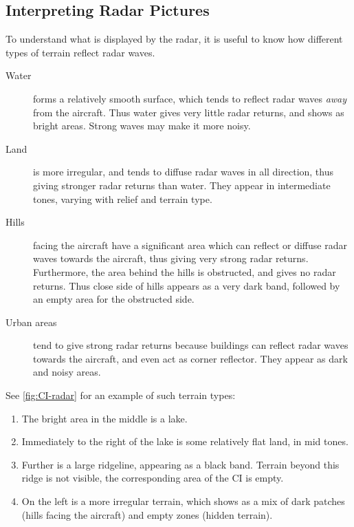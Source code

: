 \subsection{Interpreting Radar Pictures}
To understand what is displayed by the radar,
it is useful to know how different types of terrain reflect radar waves.
\begin{description}
  \item[Water] forms a relatively smooth surface, which tends to reflect radar waves \emph{away} from the aircraft.
    Thus water gives very little radar returns, and shows as bright areas.
    Strong waves may make it more noisy.

  \item[Land] is more irregular, and tends to diffuse radar waves in all direction,
    thus giving stronger radar returns than water.
    They appear in intermediate tones, varying with relief and terrain type.

  \item[Hills] facing the aircraft have a significant area which can
    reflect or diffuse radar waves towards the aircraft, thus giving very strong radar returns.
    Furthermore, the area behind the hills is obstructed, and gives no radar returns.
    Thus close side of hills appears as a very dark band, followed by an empty area for the obstructed side.

  \item[Urban areas] tend to give strong radar returns because buildings
    can reflect radar waves towards the aircraft, and even act as corner reflector.
    They appear as dark and noisy areas.
\end{description}
See \cref{fig:CI-radar} for an example of such terrain types:
\begin{enumerate}[nosep]
  \item The bright area in the middle is a lake.
  \item Immediately to the right of the lake is some relatively flat land, in mid tones.
  \item Further is a large ridgeline, appearing as a black band.
    Terrain beyond this ridge is not visible, the corresponding area of the CI is empty.
  \item On the left is a more irregular terrain, which shows as a mix
    of dark patches (hills facing the aircraft) and empty zones (hidden terrain).
\end{enumerate}

